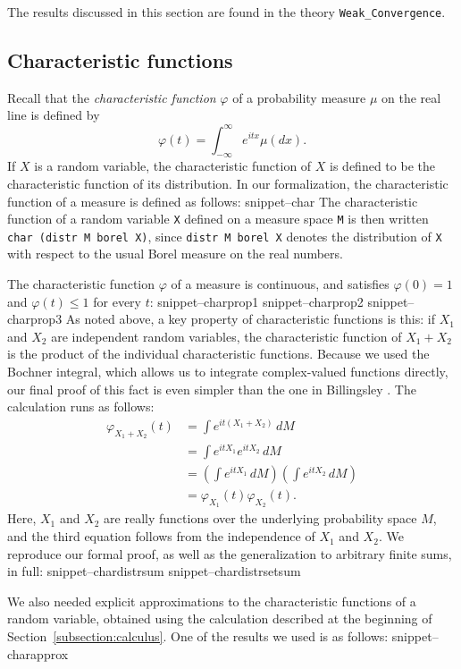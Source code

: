 \documentclass{svjour3}
\newcommand{\ph}{\varphi}
\newcommand{\Snippet}[1]{\csname snippet--#1\endcsname}
\begin{document}
The results discussed in this section are found in the theory \texttt{Weak\_Convergence}.

\subsection{Characteristic functions}
\label{subsection:characteristic}

Recall that the \emph{characteristic function} $\ph$ of a probability measure $\mu$ on the real line is defined by
\[
\ph(t) = \int_{-\infty}^{\infty} e^{itx} \mu(dx).
\]
If $X$ is a random variable, the characteristic function of $X$ is defined to be the characteristic function of its distribution.
In our formalization, the characteristic function of a measure is defined as follows:
\Snippet{char}
The characteristic function of a random variable \texttt{X} defined on a measure space \texttt{M} is then written \texttt{char (distr M borel X)}, since \texttt{distr M borel X} denotes the distribution of \texttt{X} with respect to the usual Borel measure on the real numbers.

The characteristic function $\ph$ of a measure is continuous, and satisfies $\ph(0) = 1$ and $\ph(t) \leq 1$ for every $t$:
\Snippet{charprop1}
\Snippet{charprop2}
\Snippet{charprop3}
As noted above, a key property of characteristic functions is this: if $X_1$ and $X_2$ are independent random variables, the characteristic function of $X_1 + X_2$ is the product of the individual characteristic functions. Because we used the Bochner integral, which allows us to integrate complex-valued functions directly, our final proof of this fact is even simpler than the one in Billingsley \cite{billingsley:95}. The calculation runs as follows:
\begin{align*}
\ph_{X_1 + X_2}(t) &= \int e^{i t (X_1 + X_2)} \, dM  \\
                   &= \int e^{i t X_1} e^{i t X_2} \, dM \\
                   &= \left(\int e^{i t X_1} \, dM\right) \left(\int e^{i t X_2} \, dM\right) \\
                   &= \ph_{X_1}(t) \ph_{X_2}(t).
\end{align*}
Here, $X_1$ and $X_2$ are really functions over the underlying probability space $M$, and the third equation follows from the independence of $X_1$ and $X_2$. We reproduce our formal proof, as well as the generalization to arbitrary finite sums, in full:
\Snippet{chardistrsum}
\Snippet{chardistrsetsum}

We also needed explicit approximations to the characteristic functions of a random variable, obtained using the calculation described at the beginning of Section~\ref{subsection:calculus}. One of the results we used is as follows:
\Snippet{charapprox}
\end{document}
